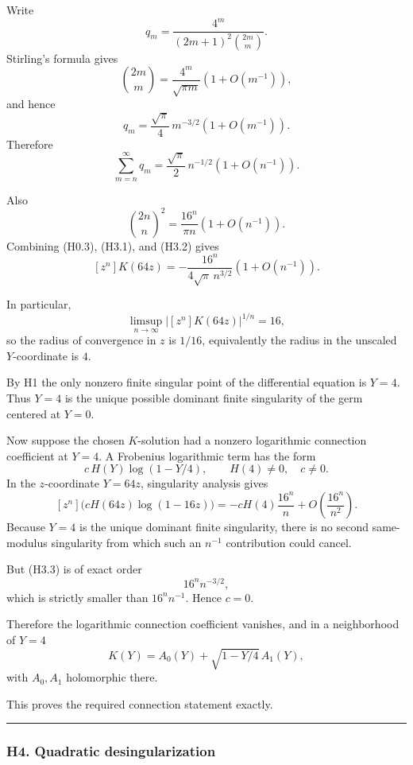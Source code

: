 \documentclass[
  10pt,
  letterpaper,
]{article}
\theoremstyle{definition}
\theoremstyle{remark}
\begin{document}
Write \[
q_m=
\frac{4^m}{(2m+1)^2\binom{2m}{m}}.
\] Stirling's formula gives \[
\binom{2m}{m}
=
\frac{4^m}{\sqrt{\pi m}}
\left(1+O(m^{-1})\right),
\] and hence \[
q_m
=
\frac{\sqrt\pi}{4}\,m^{-3/2}
\left(1+O(m^{-1})\right).
\] Therefore \[
\sum_{m=n}^{\infty}q_m
=
\frac{\sqrt\pi}{2}\,n^{-1/2}
\left(1+O(n^{-1})\right).
\tag{H3.1}
\]

Also \[
\binom{2n}{n}^2
=
\frac{16^n}{\pi n}
\left(1+O(n^{-1})\right).
\tag{H3.2}
\] Combining (H0.3), (H3.1), and (H3.2) gives \[
\boxed{
[z^n]K(64z)
=
-\frac{16^n}{4\sqrt\pi\,n^{3/2}}
\left(1+O(n^{-1})\right).
}
\tag{H3.3}
\]

In particular, \[
\limsup_{n\to\infty}|[z^n]K(64z)|^{1/n}=16,
\] so the radius of convergence in \(z\) is \(1/16\), equivalently the
radius in the unscaled \(Y\)-coordinate is \(4\).

By H1 the only nonzero finite singular point of the differential
equation is \(Y=4\). Thus \(Y=4\) is the unique possible dominant finite
singularity of the germ centered at \(Y=0\).

Now suppose the chosen \(K\)-solution had a nonzero logarithmic
connection coefficient at \(Y=4\). A Frobenius logarithmic term has the
form \[
c\,H(Y)\log(1-Y/4),
\qquad H(4)\ne0,\quad c\ne0.
\] In the \(z\)-coordinate \(Y=64z\), singularity analysis gives \[
[z^n]\bigl(cH(64z)\log(1-16z)\bigr)
=
-cH(4)\frac{16^n}{n}
+O\!\left(\frac{16^n}{n^2}\right).
\tag{H3.4}
\] Because \(Y=4\) is the unique dominant finite singularity, there is
no second same-modulus singularity from which such an \(n^{-1}\)
contribution could cancel.

But (H3.3) is of exact order \[
16^n n^{-3/2},
\] which is strictly smaller than \(16^n n^{-1}\). Hence \(c=0\).

Therefore the logarithmic connection coefficient vanishes, and in a
neighborhood of \(Y=4\) \[
\boxed{
K(Y)
=
A_0(Y)
+
\sqrt{1-Y/4}\,A_1(Y),
}
\tag{H3.5}
\] with \(A_0,A_1\) holomorphic there.

This proves the required connection statement exactly.

\begin{center}\rule{0.5\linewidth}{0.5pt}\end{center}

\subsubsection{H4. Quadratic
desingularization}\label{h4.-quadratic-desingularization}
\end{document}
